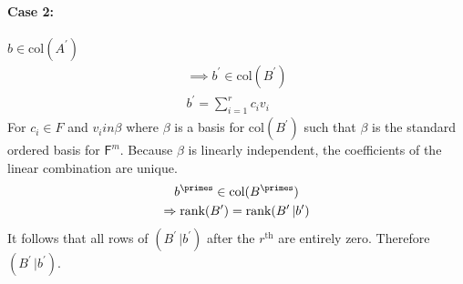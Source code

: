 \paragraph{Case 2:} $b \in \text{col}(A^\prime)$
\begin{gather}
\implies b^\prime \in \text{col}(B^\prime)\\
b^\prime = \sum\limits_{i=1}^r c_iv_i
\end{gather}
For $c_i \in F$ and $v_iin \beta$ where $\beta$ is a basis for
$\text{col}(B^\prime)$ such that $\beta$ is the standard ordered basis
for $\mathsf{F}^m$. Because $\beta$ is linearly independent, the
coefficients of the linear combination are unique.
\begin{gather}
b^\primes \in \text{col}(B^\primes)\\
\implies \rank{B^\prime} = \rank{B^\prime\,|b^\prime}
\end{gather}
It follows that all rows of $(B^\prime\,|b^\prime)$ after the
$r^{\text{th}}$  are entirely zero. Therefore $(B^\prime\,|b^\prime)$.
